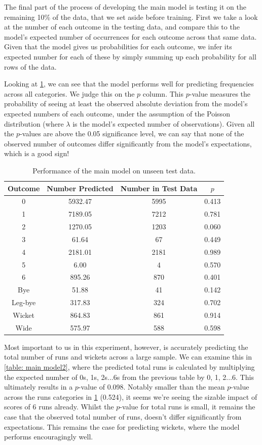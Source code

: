 The final part of the process of developing the main model is testing it on the remaining 10\% of the data, that we set aside before training. First we take a look at the number of each outcome in the testing data, and compare this to the model's expected number of occurrences for each outcome across that same data. Given that the model gives us probabilities for each outcome, we infer its expected number for each of these by simply summing up each probability for all rows of the data.

Looking at \cref{table: main model1}, we can see that the model performs well for predicting frequencies across all categories. We judge this on the $p$ column. This $p$-value measures the probability of seeing at least the observed absolute deviation from the model's expected numbers of each outcome, under the assumption of the Poisson distribution (where $\lambda$ is the model's expected number of observations). Given all the $p$-values are above the 0.05 significance level, we can say that none of the observed number of outcomes differ significantly from the model's expectations, which is a good sign!

\begin{table}[ht]
\centering
\begin{tabular} {c c c c} \toprule
    {Outcome} & {Number Predicted} & {Number in Test Data} & {$p$} \\ \midrule
     0 & 5932.47 & 5995 & 0.413 \\
     1 & 7189.05 & 7212 & 0.781 \\
     2 & 1270.05 & 1203 & 0.060 \\
     3 & 61.64 & 67 & 0.449 \\
     4 & 2181.01 & 2181 & 0.989 \\
     5 & 6.00 & 4 & 0.570 \\
     6 & 895.26 & 870 & 0.401 \\ \midrule
     Bye & 51.88 & 41 & 0.142 \\
     Leg-bye & 317.83 & 324 & 0.702 \\
     Wicket & 864.83 & 861 & 0.914 \\
     Wide & 575.97 & 588 & 0.598 \\ \bottomrule
\end{tabular}
\caption{Performance of the main model on unseen test data.}
\label{table: main model1}
\end{table}

Most important to us in this experiment, however, is accurately predicting the total number of runs and wickets across a large sample. We can examine this in \cref{table: main model2}, where the predicted total runs is calculated by multiplying the expected number of 0s, 1s, 2s...6s from the previous table by 0, 1, 2...6. This ultimately results in a $p$-value of 0.098. Notably smaller than the mean $p$-value across the runs categories in \cref{table: main model1} (0.524), it seems we're seeing the sizable impact of scores of 6 runs already. Whilst the $p$-value for total runs is small, it remains the case that the observed total number of runs, doesn't differ significantly from expectations. This remains the case for predicting wickets, where the model performs encouragingly well.

